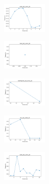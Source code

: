\begin{figure}[H]
    \begin{subfigure}
        \centering
        \includegraphics[width=0.234\textwidth]{img/copkm/ecoli_set_const_20_589741062_time.png}
    \end{subfigure}
    \hfill
    \begin{subfigure}
        \centering
        \includegraphics[width=0.234\textwidth]{img/copkm/rand_set_const_20_589741062_time.png}
    \end{subfigure}
    \hfill
    \begin{subfigure}
        \centering
        \includegraphics[width=0.234\textwidth]{img/copkm/newthyroid_set_const_20_589741062_time.png}
    \end{subfigure}
    \hfill
    \begin{subfigure}
        \centering
        \includegraphics[width=0.234\textwidth]{img/copkm/iris_set_const_20_277451237_time.png}
    \end{subfigure}
    \hfill
    \begin{subfigure}
        \centering
        \includegraphics[width=0.234\textwidth]{img/copkm/ecoli_set_const_20_277451237_time.png}
    \end{subfigure}
    \hfill
    \begin{subfigure}
        \centering

\end{subfigure}
\end{figure}
